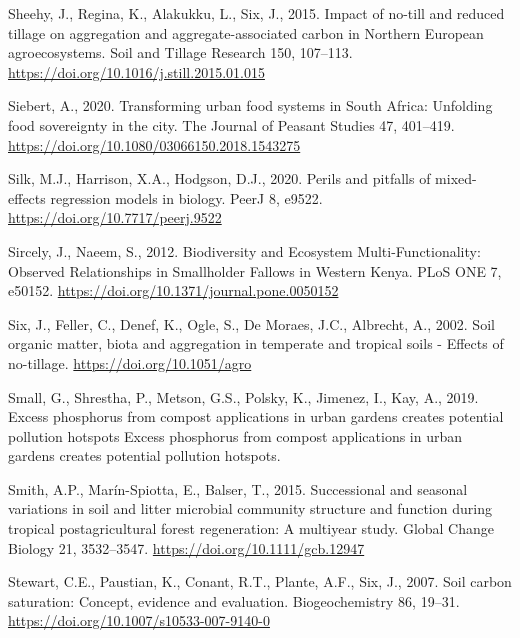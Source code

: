 \documentclass[
  12pt,
]{article}
\newlength{\cslhangindent}
\newlength{\cslentryspacingunit} %
\newenvironment{CSLReferences}[2] %
 {%
  \setlength{\parindent}{0pt}
  \ifodd #1
  \let\oldpar\par
  \def\par{\hangindent=\cslhangindent\oldpar}
  \fi
  \setlength{\parskip}{#2\cslentryspacingunit}
 }%
 {}
\begin{document}
\begin{CSLReferences}{1}{0}
\leavevmode{}%
Sheehy, J., Regina, K., Alakukku, L., Six, J., 2015. Impact of no-till and reduced tillage on aggregation and aggregate-associated carbon in {Northern European} agroecosystems. Soil and Tillage Research 150, 107--113. \url{https://doi.org/10.1016/j.still.2015.01.015}

\leavevmode{}%
Siebert, A., 2020. Transforming urban food systems in {South Africa}: Unfolding food sovereignty in the city. The Journal of Peasant Studies 47, 401--419. \url{https://doi.org/10.1080/03066150.2018.1543275}

\leavevmode{}%
Silk, M.J., Harrison, X.A., Hodgson, D.J., 2020. Perils and pitfalls of mixed-effects regression models in biology. PeerJ 8, e9522. \url{https://doi.org/10.7717/peerj.9522}

\leavevmode{}%
Sircely, J., Naeem, S., 2012. Biodiversity and {Ecosystem Multi-Functionality}: {Observed Relationships} in {Smallholder Fallows} in {Western Kenya}. PLoS ONE 7, e50152. \url{https://doi.org/10.1371/journal.pone.0050152}

\leavevmode{}%
Six, J., Feller, C., Denef, K., Ogle, S., De Moraes, J.C., Albrecht, A., 2002. Soil organic matter, biota and aggregation in temperate and tropical soils - {Effects} of no-tillage. \url{https://doi.org/10.1051/agro}

\leavevmode{}%
Small, G., Shrestha, P., Metson, G.S., Polsky, K., Jimenez, I., Kay, A., 2019. Excess phosphorus from compost applications in urban gardens creates potential pollution hotspots {Excess} phosphorus from compost applications in urban gardens creates potential pollution hotspots.

\leavevmode{}%
Smith, A.P., Marín-Spiotta, E., Balser, T., 2015. Successional and seasonal variations in soil and litter microbial community structure and function during tropical postagricultural forest regeneration: {A} multiyear study. Global Change Biology 21, 3532--3547. \url{https://doi.org/10.1111/gcb.12947}

\leavevmode{}%
Stewart, C.E., Paustian, K., Conant, R.T., Plante, A.F., Six, J., 2007. Soil carbon saturation: Concept, evidence and evaluation. Biogeochemistry 86, 19--31. \url{https://doi.org/10.1007/s10533-007-9140-0}


\end{CSLReferences}
\end{document}
